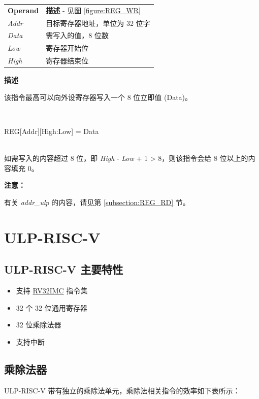 \documentclass[main\_\_CN.tex]{subfiles}
\begin{document}
\begin{tabular}{ l l }
\textbf{Operand} & \textbf{描述} - 见图 \ref{figure:REG_WR} \\
\textit{Addr} & 目标寄存器地址，单位为 32 位字 \\
\textit{Data} & 需写入的值，8 位数 \\
\textit{Low} & 寄存器开始位 \\
\textit{High} & 寄存器结束位
\end{tabular}

\textbf{描述}

该指令最高可以向外设寄存器写入一个 8 位立即值 (Data)。

~
\begin{centering}
    REG[Addr][High:Low] = Data \\
\end{centering}
~\\
如需写入的内容超过 8 位，即 \textit{High} - \textit{Low} + 1 > 8，则该指令会给 8 位以上的内容填充 0。

\textbf{注意：}

有关 \textit{addr\_ulp} 的内容，请见第 \ref{subsection:REG_RD} 节。



\section{ULP-RISC-V} \label{subsection:PicoRV32}
\subsection{ULP-RISC-V 主要特性}
\begin{itemize}
    \item 支持 \href{https://riscv.org/specifications/}{RV32IMC} 指令集
    \item 32 个 32 位通用寄存器
    \item 32 位乘除法器
    \item 支持中断
\end{itemize}

\subsection{乘除法器}
ULP-RISC-V 带有独立的乘除法单元，乘除法相关指令的效率如下表所示：
\end{document}
